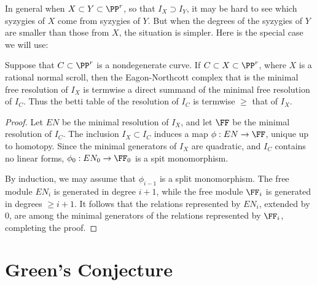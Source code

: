 
In general when $X\subset Y\subset \PP^r$, so that $I_X \supset I_Y$, it may be hard to see which syzygies of $X$ come
from syzygies of $Y$. But when the degrees of the syzygies of $Y$ are smaller than those from $X$, the situation is simpler.
Here is the special case we will use:

\begin{proposition}
Suppose that $C\subset \PP^r$ is a nondegenerate curve. If $C\subset X \subset \PP^r$, where $X$ is a rational
normal scroll, then the Eagon-Northcott complex that is  the minimal free resolution of $I_X$ is termwise a direct summand
of the minimal free resolution of $I_C$. Thus the betti table of the resolution of $I_C$ is termwise $\geq$ that of $I_X$.
\end{proposition}

\begin{proof}
Let $EN$ be the minimal resolution of $I_X$, and let $\FF$ be the minimal resolution of $I_C$.
The inclusion $I_X \subset I_C$ induces a map $\phi: EN\to \FF$, unique up to homotopy. Since the minimal generators of $I_X$ are quadratic, and $I_C$ contains no linear forms, $\phi_0: EN_0\to \FF_0$ is a spit monomorphism.

By induction, we may assume that $\phi_{i-1}$ is a split monomorphism. The free module $EN_{i}$ is generated in 
degree $i+1$, while the free module $\FF_i$ is generated in degrees $\geq i+1$. It follows that the relations
represented by $EN_i$, extended by 0, are among the minimal generators of the relations represented by $\FF_i$,
completing the proof.
 \end{proof}
 
\section{Green's Conjecture}

